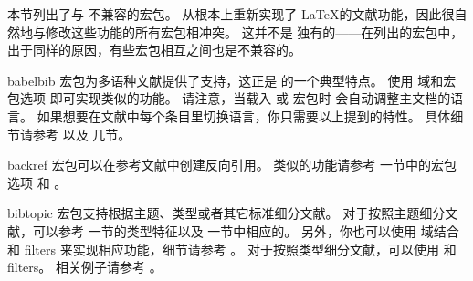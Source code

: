 本节列出了与 \biblatex 不兼容的宏包。
\biblatex 从根本上重新实现了 \LaTeX 的文献功能，因此很自然地与修改这些功能的所有宏包相冲突。
这并不是 \biblatex 独有的——在列出的宏包中，出于同样的原因，有些宏包相互之间也是不兼容的。

\begin{marglist}

\item[babelbib]
 宏包为多语种文献提供了支持，这正是 \biblatex 的一个典型特点。
使用  域和宏包选项  即可实现类似的功能。
请注意，当载入  或  宏包时 \biblatex 会自动调整主文档的语言。
如果想要在文献中每个条目里切换语言，你只需要以上提到的特性。
具体细节请参考  以及  几节。

\item[backref]
 宏包可以在参考文献中创建反向引用。
类似的功能请参考  一节中的宏包选项  和 。

\item[bibtopic]
 宏包支持根据主题、类型或者其它标准细分文献。
对于按照主题细分文献，可以参考  一节的类型特征以及  一节中相应的。
另外，你也可以使用  域结合  和  filters 来实现相应功能，细节请参考 。
对于按照类型细分文献，可以使用  和  filters。
相关例子请参考 。


\end{marglist}
